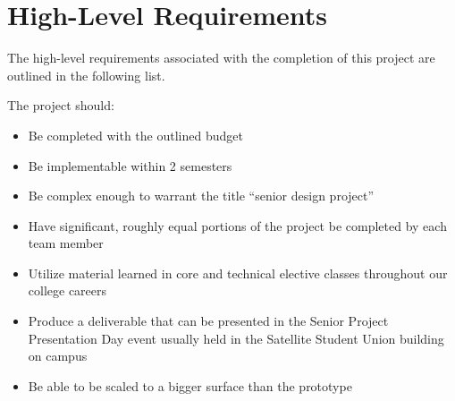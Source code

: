  
 \section{High-Level Requirements}
The high-level requirements associated with the completion of this project are outlined in the following list. \par
\setlength{\parindent}{2.5ex} The project should:
\begin{itemize}
\item Be completed with the outlined budget
\item Be implementable within 2 semesters
\item Be complex enough to warrant the title ``senior design project''
\item Have significant, roughly equal portions of the project be completed by each team member
\item Utilize material learned in core and technical elective classes throughout our college careers
\item Produce a deliverable that can be presented in the Senior Project Presentation Day event usually held in the Satellite Student Union building on campus
\item Be able to be scaled to a bigger surface than the prototype
\end{itemize}
 
